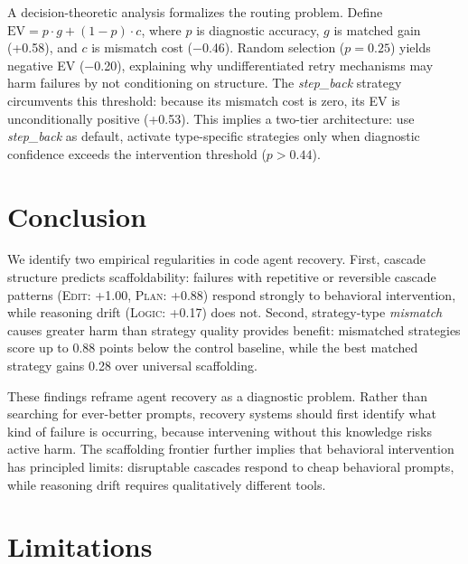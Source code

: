 \documentclass[11pt]{article}
\begin{document}
A decision-theoretic analysis formalizes the routing problem.
Define $\text{EV} = p \cdot g + (1-p) \cdot c$, where $p$ is diagnostic accuracy, $g$ is matched gain (+0.58), and $c$ is mismatch cost ($-$0.46).
Random selection ($p{=}0.25$) yields negative EV ($-$0.20), explaining why undifferentiated retry mechanisms may harm failures by not conditioning on structure.
The \textit{step\_back} strategy circumvents this threshold: because its mismatch cost is zero, its EV is unconditionally positive (+0.53).
This implies a two-tier architecture: use \textit{step\_back} as default, activate type-specific strategies only when diagnostic confidence exceeds the intervention threshold ($p > 0.44$).


\section{Conclusion}

We identify two empirical regularities in code agent recovery.
First, cascade structure predicts scaffoldability: failures with repetitive or reversible cascade patterns (\textsc{Edit}: +1.00, \textsc{Plan}: +0.88) respond strongly to behavioral intervention, while reasoning drift (\textsc{Logic}: +0.17) does not.
Second, strategy-type \textit{mismatch} causes greater harm than strategy quality provides benefit: mismatched strategies score up to 0.88 points below the control baseline, while the best matched strategy gains 0.28 over universal scaffolding.

These findings reframe agent recovery as a diagnostic problem.
Rather than searching for ever-better prompts, recovery systems should first identify what kind of failure is occurring, because intervening without this knowledge risks active harm.
The scaffolding frontier further implies that behavioral intervention has principled limits: disruptable cascades respond to cheap behavioral prompts, while reasoning drift requires qualitatively different tools.

\section*{Limitations}
\end{document}
